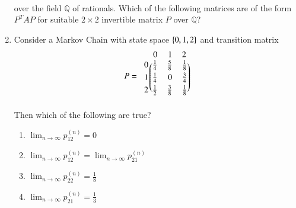 \begin{enumerate}[label=\thesection.\arabic*.,ref=\thesection.\theenumi]
\begin{align}
\end{align}
over the field $\mathbb{Q}$ of rationals.  Which of the following matrices are of the form $P^TAP$ for suitable $2\times 2$ invertible matrix $P$ over $\mathbb{Q}$?
\begin{enumerate}
\end{enumerate}
\item Consider a Markov Chain with state space $\left\{0,1,2\right\}$ and transition matrix
\begin{align}
P = 
\begin{blockarray}{c@{\hspace{1pt}}rrr@{\hspace{3pt}}}
         & 0   & 1   & 2 \\
        \begin{block}{r@{\hspace{3pt}}@{\hspace{1pt}}
    (@{\hspace{1pt}}rrr@{\hspace{1pt}}@{\hspace{1pt}})}
        0 & \frac{1}{4} & \frac{5}{8} & \frac{1}{8}  \\[1mm]
        1 & \frac{1}{4} & 0 & \frac{3}{4}  \\[1mm]
        2 &  \frac{1}{2} & \frac{3}{8} & \frac{1}{8}  \\
        \end{block}
    \end{blockarray}
\end{align}
Then which of the following are true?
\begin{enumerate}
\item $\lim_{n \to \infty} p_{12}^{(n)} = 0$
\item $\lim_{n \to \infty} p_{12}^{(n)} = \lim_{n \to \infty} p_{21}^{(n)}$
\item $\lim_{n \to \infty} p_{22}^{(n)} = \frac{1}{8}$
\item $\lim_{n \to \infty} p_{21}^{(n)} = \frac{1}{3}$
\end{enumerate}
\end{enumerate}

